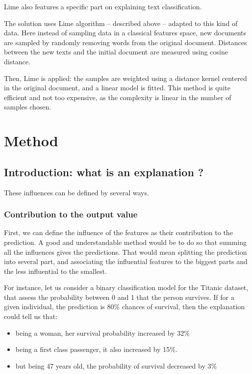 \documentclass[a4paper,11pt]{kth-mag}
\begin{document}
Lime \cite{lime} also features a specific part on explaining text classification.

The solution uses Lime algorithm -- described above -- adapted to this kind of data. Here instead of sampling data in a classical features space, new documents are sampled by randomly removing words from the original document. Distances between the new texts and the initial document are measured using cosine distance.

Then, Lime is applied: the samples are weighted using a distance kernel centered in the original document, and a linear model is fitted. This method is quite efficient and not too expensive, as the complexity is linear in the number of samples chosen.

\chapter{Method}

\section{Introduction: what is an explanation ?}

These influences can be defined by several ways.

\subsection{Contribution to the output value}

First, we can define the influence of the features as their contribution to the prediction. A good and understandable method would be to do so that summing all the influences gives the predictions. That would mean splitting the prediction into several part, and associating the influential features to the biggest parts and the less influential to the smallest.

For instance, let us consider a binary classification model for the Titanic dataset, that assess the probability between 0 and 1 that the person survives.
If for a given individual, the prediction is 80\% chances of survival, then the explanation could tell us that:

\begin{itemize}
\item being a woman, her survival probability increased by 32\%
\item being a first class passenger, it also increased by 15\%.
\item but being 47 years old, the probability of survival decreased by 3\%
\end{itemize}
\end{document}

